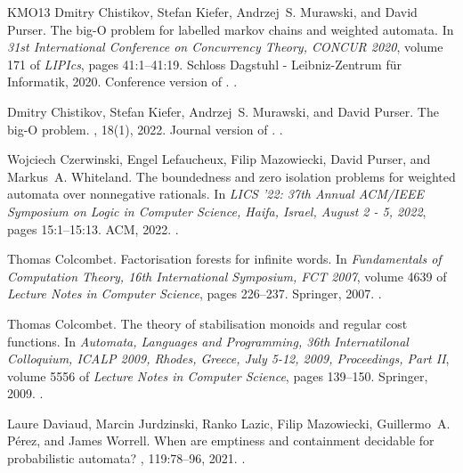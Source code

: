 \documentclass[10pt,a4paper]{amsart}
\theoremstyle{definition}
\numberwithin{equation}{section}
\theoremstyle{remark}
\theoremstyle{remark}
\begin{document}
\begin{thebibliography}{KMO{\etalchar{+}}13}
Dmitry Chistikov, Stefan Kiefer, Andrzej~S. Murawski, and David Purser.
\newblock The big-{O} problem for labelled markov chains and weighted automata.
\newblock In {\em 31st International Conference on Concurrency Theory, {CONCUR}
  2020}, volume 171 of {\em LIPIcs}, pages 41:1--41:19. Schloss Dagstuhl -
  Leibniz-Zentrum f{\"{u}}r Informatik, 2020.
\newblock Conference version of \cite{ChistikovKMP22}.
\newblock \href {https://doi.org/10.4230/LIPIcs.CONCUR.2020.41}
  {}.

Dmitry Chistikov, Stefan Kiefer, Andrzej~S. Murawski, and David Purser.
\newblock The big-{O} problem.
, 18(1), 2022.
\newblock Journal version of \cite{ChistikovKMP20}.
\newblock \href {https://doi.org/10.46298/lmcs-18(1:40)2022}
  {}.

Wojciech Czerwinski, Engel Lefaucheux, Filip Mazowiecki, David Purser, and
  Markus~A. Whiteland.
\newblock The boundedness and zero isolation problems for weighted automata
  over nonnegative rationals.
\newblock In {\em {LICS} '22: 37th Annual {ACM/IEEE} Symposium on Logic in
  Computer Science, Haifa, Israel, August 2 - 5, 2022}, pages 15:1--15:13.
  {ACM}, 2022.
\newblock \href {https://doi.org/10.1145/3531130.3533336}
  {}.

Thomas Colcombet.
\newblock Factorisation forests for infinite words.
\newblock In {\em Fundamentals of Computation Theory, 16th International
  Symposium, {FCT} 2007}, volume 4639 of {\em Lecture Notes in Computer
  Science}, pages 226--237. Springer, 2007.
\newblock \href {https://doi.org/10.1007/978-3-540-74240-1_20}
  {}.

Thomas Colcombet.
\newblock The theory of stabilisation monoids and regular cost functions.
\newblock In {\em Automata, Languages and Programming, 36th Internatilonal
  Colloquium, {ICALP} 2009, Rhodes, Greece, July 5-12, 2009, Proceedings, Part
  {II}}, volume 5556 of {\em Lecture Notes in Computer Science}, pages
  139--150. Springer, 2009.
\newblock \href {https://doi.org/10.1007/978-3-642-02930-1_12}
  {}.

Laure Daviaud, Marcin Jurdzinski, Ranko Lazic, Filip Mazowiecki, Guillermo~A.
  P{\'{e}}rez, and James Worrell.
\newblock When are emptiness and containment decidable for probabilistic
  automata?
, 119:78--96, 2021.
\newblock \href {https://doi.org/10.1016/j.jcss.2021.01.006}
  {}.


\end{thebibliography}
\end{document}

